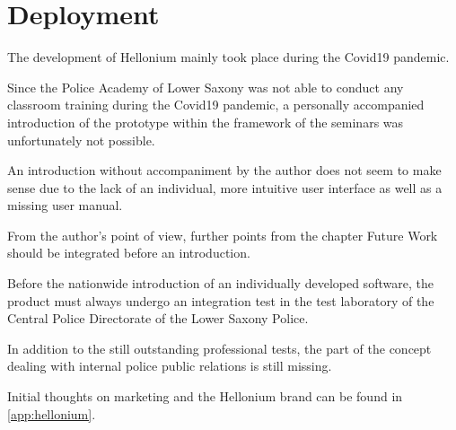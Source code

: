 \chapter{Deployment}
\label{chap:deployment}

The development of Hellonium mainly took place during the Covid19 pandemic.

Since the Police Academy of Lower Saxony was not able to conduct any classroom training during the Covid19 pandemic, a personally accompanied introduction of the prototype within the framework of the seminars was unfortunately not possible.

An introduction without accompaniment by the author does not seem to make sense due to the lack of an individual, more intuitive user interface as well as a missing user manual.

From the author's point of view, further points from the chapter Future Work should be integrated before an introduction.

Before the nationwide introduction of an individually developed software, the product must always undergo an integration test in the test laboratory of the Central Police Directorate of the Lower Saxony Police.

In addition to the still outstanding professional tests, the part of the concept dealing with internal police public relations is still missing.

Initial thoughts on marketing and the Hellonium brand can be found in \cref{app:hellonium}.